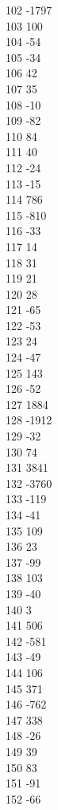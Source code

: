 { 102	-1797 \\
 103	100 \\
 104	-54 \\
 105	-34 \\
 106	42 \\
 107	35 \\
 108	-10 \\
 109	-82 \\
 110	84 \\
 111	40 \\
 112	-24 \\
 113	-15 \\
 114	786 \\
 115	-810 \\
 116	-33 \\
 117	14 \\
 118	31 \\
 119	21 \\
 120	28 \\
 121	-65 \\
 122	-53 \\
 123	24 \\
 124	-47 \\
 125	143 \\
 126	-52 \\
 127	1884 \\
 128	-1912 \\
 129	-32 \\
 130	74 \\
 131	3841 \\
 132	-3760 \\
 133	-119 \\
 134	-41 \\
 135	109 \\
 136	23 \\
 137	-99 \\
 138	103 \\
 139	-40 \\
 140	3 \\
 141	506 \\
 142	-581 \\
 143	-49 \\
 144	106 \\
 145	371 \\
 146	-762 \\
 147	338 \\
 148	-26 \\
 149	39 \\
 150	83 \\
 151	-91 \\
 152	-66 \\
}
